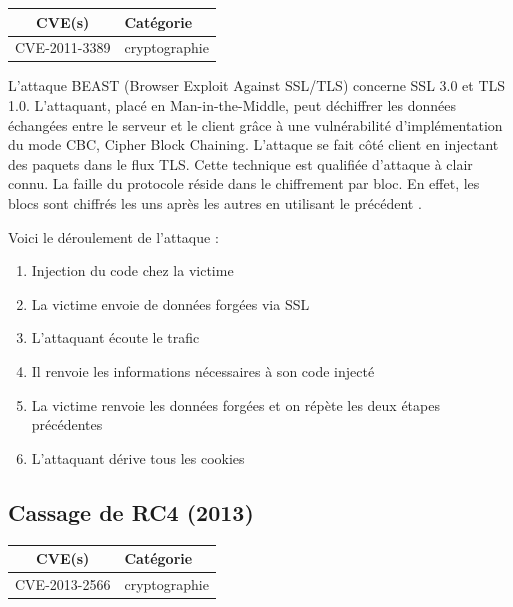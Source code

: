 \begin{tabularx}{0.96\textwidth}{|c|X|}
  \hline
  \textbf{CVE(s)} & \textbf{Catégorie} \\
  \hline
  CVE-2011-3389 & cryptographie \\
  \hline
\end{tabularx}

\vspace{1em}

L'attaque BEAST (Browser Exploit Against SSL/TLS) concerne SSL 3.0 et TLS 1.0. L'attaquant, placé en Man-in-the-Middle, peut déchiffrer les données échangées entre le serveur et le client grâce à une vulnérabilité d'implémentation du mode CBC, Cipher Block Chaining. L'attaque se fait côté client en injectant des paquets dans le flux TLS. Cette technique est qualifiée d'attaque à clair connu. La faille du protocole réside dans le chiffrement par bloc. En effet, les blocs sont chiffrés les uns après les autres en utilisant le précédent \cite{beast}.

Voici le déroulement de l'attaque :

\begin{enumerate}
\item Injection du code chez la victime
\item La victime envoie de données forgées via SSL
\item L'attaquant écoute le trafic
\item Il renvoie les informations nécessaires à son code injecté
\item La victime renvoie les données forgées et on répète les deux étapes précédentes
  \item L'attaquant dérive tous les cookies
\end{enumerate}




\subsection{Cassage de RC4 (2013)}

\begin{tabularx}{0.96\textwidth}{|c|X|}
  \hline
  \textbf{CVE(s)} & \textbf{Catégorie} \\
  \hline
  CVE-2013-2566 & cryptographie \\
  \hline
\end{tabularx}


